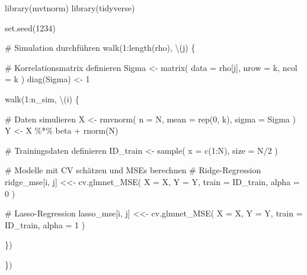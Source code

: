 \documentclass[
  a4paper,
  DIV=11,
  oneside]{scrreprt}
\newenvironment{Shaded}{\begin{snugshade}}{\end{snugshade}}
\newcommand{\AttributeTok}[1]{\textcolor[rgb]{0.40,0.45,0.13}{#1}}
\newcommand{\CommentTok}[1]{\textcolor[rgb]{0.37,0.37,0.37}{#1}}
\newcommand{\DecValTok}[1]{\textcolor[rgb]{0.68,0.00,0.00}{#1}}
\newcommand{\FunctionTok}[1]{\textcolor[rgb]{0.28,0.35,0.67}{#1}}
\newcommand{\NormalTok}[1]{\textcolor[rgb]{0.00,0.23,0.31}{#1}}
\newcommand{\OtherTok}[1]{\textcolor[rgb]{0.00,0.23,0.31}{#1}}
\newcommand{\SpecialCharTok}[1]{\textcolor[rgb]{0.37,0.37,0.37}{#1}}
\begin{document}
\begin{Shaded}
\begin{Highlighting}[]
\FunctionTok{library}\NormalTok{(mvtnorm)}
\FunctionTok{library}\NormalTok{(tidyverse)}

\FunctionTok{set.seed}\NormalTok{(}\DecValTok{1234}\NormalTok{)}

\CommentTok{\# Simulation durchführen}
\FunctionTok{walk}\NormalTok{(}\DecValTok{1}\SpecialCharTok{:}\FunctionTok{length}\NormalTok{(rho), \textbackslash{}(j) \{}
  
  \CommentTok{\# Korrelationsmatrix definieren}
\NormalTok{  Sigma }\OtherTok{\textless{}{-}} \FunctionTok{matrix}\NormalTok{(}
    \AttributeTok{data =}\NormalTok{ rho[j], }
    \AttributeTok{nrow =}\NormalTok{ k, }
    \AttributeTok{ncol =}\NormalTok{ k}
\NormalTok{  )}
  \FunctionTok{diag}\NormalTok{(Sigma) }\OtherTok{\textless{}{-}} \DecValTok{1}
  
  \FunctionTok{walk}\NormalTok{(}\DecValTok{1}\SpecialCharTok{:}\NormalTok{n\_sim, \textbackslash{}(i) \{}
    
  \CommentTok{\# Daten simulieren}
\NormalTok{  X }\OtherTok{\textless{}{-}} \FunctionTok{rmvnorm}\NormalTok{(}
    \AttributeTok{n =}\NormalTok{ N, }
    \AttributeTok{mean =} \FunctionTok{rep}\NormalTok{(}\DecValTok{0}\NormalTok{, k), }
    \AttributeTok{sigma =}\NormalTok{ Sigma}
\NormalTok{  )}
\NormalTok{  Y }\OtherTok{\textless{}{-}}\NormalTok{ X }\SpecialCharTok{\%*\%}\NormalTok{ beta }\SpecialCharTok{+} \FunctionTok{rnorm}\NormalTok{(N)}
    
  \CommentTok{\# Trainingsdaten definieren}
\NormalTok{  ID\_train }\OtherTok{\textless{}{-}} \FunctionTok{sample}\NormalTok{(}
    \AttributeTok{x =} \FunctionTok{c}\NormalTok{(}\DecValTok{1}\SpecialCharTok{:}\NormalTok{N), }
    \AttributeTok{size =}\NormalTok{ N}\SpecialCharTok{/}\DecValTok{2}
\NormalTok{  )}
    
  \CommentTok{\# Modelle mit CV schätzen und MSEs berechnen}
  \CommentTok{\# Ridge{-}Regression}
\NormalTok{  ridge\_mse[i, j] }\OtherTok{\textless{}\textless{}{-}} \FunctionTok{cv.glmnet\_MSE}\NormalTok{(}
    \AttributeTok{X =}\NormalTok{ X, }
    \AttributeTok{Y =}\NormalTok{ Y, }
    \AttributeTok{train =}\NormalTok{ ID\_train, }
    \AttributeTok{alpha =} \DecValTok{0}
\NormalTok{  )}
  
  \CommentTok{\# Lasso{-}Regression}
\NormalTok{  lasso\_mse[i, j] }\OtherTok{\textless{}\textless{}{-}} \FunctionTok{cv.glmnet\_MSE}\NormalTok{(}
    \AttributeTok{X =}\NormalTok{ X, }
    \AttributeTok{Y =}\NormalTok{ Y, }
    \AttributeTok{train =}\NormalTok{ ID\_train, }
    \AttributeTok{alpha =} \DecValTok{1}
\NormalTok{  )}
  
\NormalTok{  \})}
  
\NormalTok{\})}
\end{Highlighting}
\end{Shaded}
\end{document}

